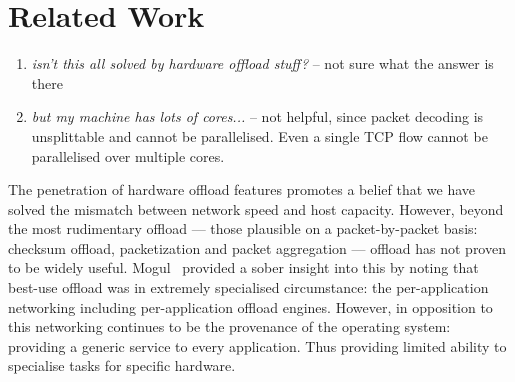 
\section{Related Work}

\begin{enumerate}
 \item \emph{isn't this all solved by hardware offload stuff?} -- not sure what the answer is there
 \item \emph{but my machine has lots of cores...} -- not helpful, since packet decoding is unsplittable and cannot be parallelised. Even a single TCP flow cannot be parallelised over multiple cores.
\end{enumerate}


The penetration of hardware offload features promotes a belief that we have solved the mismatch between network speed and host capacity. However, beyond the most rudimentary offload --- those plausible on a packet-by-packet basis: checksum offload, packetization and packet aggregation --- offload has not proven to be widely useful. Mogul~\cite{mogul2003tcp} provided a sober insight into this by noting that best-use offload was in extremely specialised circumstance: the per-application networking including per-application offload engines. However, in opposition to this networking continues to be the provenance of the operating system: providing a generic service to every application. Thus providing limited ability to specialise tasks for specific hardware.

